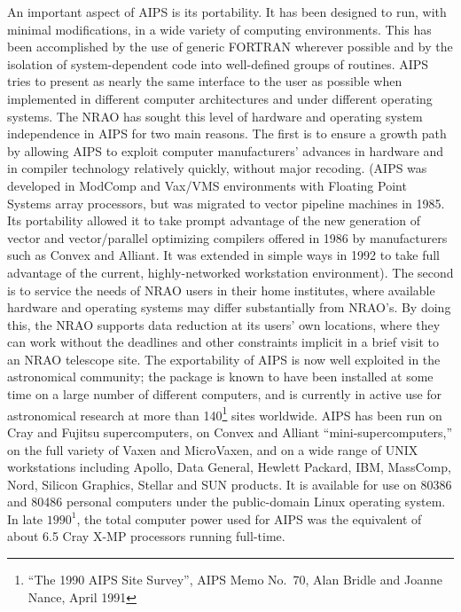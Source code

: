     An important aspect of AIPS is its portability.  It has been
designed to run, with minimal modifications, in a wide variety of
computing environments.  This has been accomplished by the use of
generic FORTRAN wherever possible and by the isolation of
system-dependent code into well-defined groups of routines.  AIPS
tries to present as nearly the same interface to the user as possible
when implemented in different computer architectures and under
different operating systems.  The NRAO has sought this level of
hardware and operating system independence in AIPS for two main
reasons.  The first is to ensure a growth path by allowing AIPS to
exploit computer manufacturers' advances in hardware and in compiler
technology relatively quickly, without major recoding.  (AIPS was
developed in ModComp and Vax/VMS environments with Floating Point
Systems array processors, but was migrated to vector pipeline machines
in 1985.  Its portability allowed it to take prompt advantage of the
new generation of vector and vector/parallel optimizing compilers
offered in 1986 by manufacturers such as Convex and Alliant.  It was
extended in simple ways in 1992 to take full advantage of the current,
highly-networked workstation environment).  The second is to service
the needs of NRAO users in their home institutes, where available
hardware and operating systems may differ substantially from NRAO's.
By doing this, the NRAO supports data reduction at its users' own
locations, where they can work without the deadlines and other
constraints implicit in a brief visit to an NRAO telescope site.  The
exportability of AIPS is now well exploited in the astronomical
community; the package is known to have been installed at some time on
a large number of different computers, and is currently in active use
for astronomical research at more than 140\footnote{``The 1990 AIPS
Site Survey'', AIPS Memo No.~70, Alan Bridle and Joanne Nance, April
1991} sites worldwide.  AIPS has been run on Cray and Fujitsu
supercomputers, on Convex and Alliant ``mini-supercomputers,'' on the
full variety of Vaxen and MicroVaxen, and on a wide range of UNIX
workstations including Apollo, Data General, Hewlett Packard, IBM,
MassComp, Nord, Silicon Graphics, Stellar and SUN products.  It is
available for use on 80386 and 80486 personal computers under the
public-domain Linux operating system.  In late $1990^1$, the total
computer power used for AIPS was the equivalent of about 6.5 Cray X-MP
processors running full-time.

